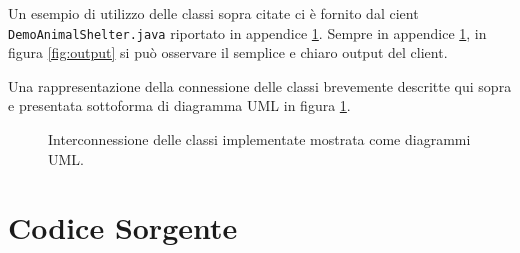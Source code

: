 \documentclass[a4paper,11pt]{article}
\begin{document}
Un esempio di utilizzo delle classi sopra citate ci è fornito dal cient {\tt DemoAnimalShelter.java} riportato in appendice \ref{appendice:A}. Sempre in appendice \ref{appendice:A}, in figura \ref{fig:output} si può osservare il semplice e chiaro output del client.

Una rappresentazione della connessione delle classi brevemente descritte qui sopra e presentata sottoforma di diagramma UML in figura \ref{fig:UML}.

\begin{figure}[!t]
  \caption{\small Interconnessione delle classi implementate mostrata come diagrammi UML.}
  \label{fig:UML}
\end{figure}


\newpage
\printbibliography


\newpage
\appendix
\section{Codice Sorgente}
\label{appendice:A}
\end{document}

